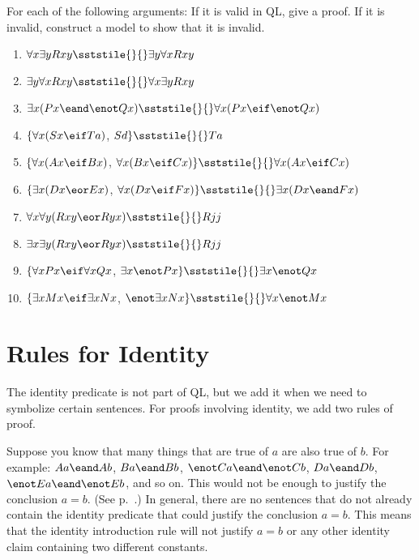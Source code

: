 \problempart
\label{pr.QLvalidornot}
For each of the following arguments: If it is valid in QL, give a proof. If it is invalid, construct a model to show that it is invalid.
\begin{enumerate}[label=\arabic*), topsep=0pt, parsep=0pt, itemsep=3pt]
\item $\forall x\exists y Rxy \sststile{}{} \exists y\forall x Rxy$
\item $\exists y\forall x Rxy \sststile{}{} \forall x\exists y Rxy$
\item $\exists x(Px \eand \enot Qx) \sststile{}{} \forall x(Px \eif \enot Qx)$
\item $\{\forall x(Sx \eif Ta)$, $Sd\} \sststile{}{}Ta$
\item $\{\forall x(Ax\eif Bx)$, $\forall x(Bx \eif Cx)\} \sststile{}{} \forall x(Ax \eif Cx)$
\item $\{\exists x(Dx \eor Ex)$, $\forall x(Dx \eif Fx)\} \sststile{}{} \exists x(Dx \eand Fx)$
\item $\forall x\forall y(Rxy \eor Ryx)\sststile{}{} Rjj$
\item $\exists x\exists y(Rxy \eor Ryx)\sststile{}{}Rjj$
\item $\{\forall x Px \eif \forall x Qx$, $\exists x \enot Px\}\sststile{}{}\exists x \enot Qx$
\item $\{\exists x Mx \eif \exists x Nx$, $\enot \exists x Nx\}\sststile{}{} \forall x \enot Mx$
\end{enumerate}



\section{Rules for Identity}
The identity predicate is not part of QL, but we add it when we need to symbolize certain sentences. For proofs involving identity, we add two rules of proof.

Suppose you know that many things that are true of $a$ are also true of $b$. For example: $Aa\eand Ab$, $Ba\eand Bb$, $\enot Ca\eand\enot Cb$, $Da\eand Db$, $\enot Ea\eand\enot Eb$, and so on. This would not be enough to justify the conclusion $a=b$. (See p.~\pageref{model.nonidentity}.) In general, there are no sentences that do not already contain the identity predicate that could justify the conclusion $a=b$. This means that the identity introduction rule will not justify $a=b$ or any other identity claim containing two different constants.

